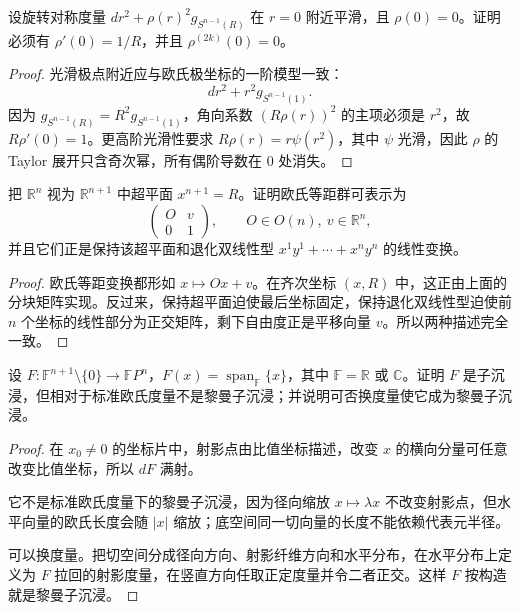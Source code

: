 \documentclass[11pt,a4paper,openany]{ctexbook}
\numberwithin{equation}{chapter}
\begin{document}
\begin{problem}
设旋转对称度量 \(dr^2+\rho(r)^2g_{S^{n-1}(R)}\) 在 \(r=0\) 附近平滑，且 \(\rho(0)=0\)。证明必须有 \(\rho'(0)=1/R\)，并且 \(\rho^{(2k)}(0)=0\)。
\end{problem}
\begin{proof}
光滑极点附近应与欧氏极坐标的一阶模型一致：
\[
dr^2+r^2g_{S^{n-1}(1)}.
\]
因为 \(g_{S^{n-1}(R)}=R^2g_{S^{n-1}(1)}\)，角向系数 \((R\rho(r))^2\) 的主项必须是 \(r^2\)，故 \(R\rho'(0)=1\)。更高阶光滑性要求 \(R\rho(r)=r\psi(r^2)\)，其中 \(\psi\) 光滑，因此 \(\rho\) 的 Taylor 展开只含奇次幂，所有偶阶导数在 \(0\) 处消失。
\end{proof}

\begin{problem}
把 \(\mathbb R^n\) 视为 \(\mathbb R^{n+1}\) 中超平面 \(x^{n+1}=R\)。证明欧氏等距群可表示为
\[
\begin{pmatrix}O&v\\0&1\end{pmatrix},\qquad O\in O(n),\ v\in\mathbb R^n,
\]
并且它们正是保持该超平面和退化双线性型 \(x^1y^1+\cdots+x^ny^n\) 的线性变换。
\end{problem}
\begin{proof}
欧氏等距变换都形如 \(x\mapsto Ox+v\)。在齐次坐标 \((x,R)\) 中，这正由上面的分块矩阵实现。反过来，保持超平面迫使最后坐标固定，保持退化双线性型迫使前 \(n\) 个坐标的线性部分为正交矩阵，剩下自由度正是平移向量 \(v\)。所以两种描述完全一致。
\end{proof}

\begin{problem}
设 \(F\colon \mathbb F^{n+1}\setminus\{0\}\to\mathbb FP^n\)，\(F(x)=\operatorname{span}_{\mathbb F}\{x\}\)，其中 \(\mathbb F=\mathbb R\) 或 \(\mathbb C\)。证明 \(F\) 是子沉浸，但相对于标准欧氏度量不是黎曼子沉浸；并说明可否换度量使它成为黎曼子沉浸。
\end{problem}
\begin{proof}
在 \(x_0\ne0\) 的坐标片中，射影点由比值坐标描述，改变 \(x\) 的横向分量可任意改变比值坐标，所以 \(dF\) 满射。

它不是标准欧氏度量下的黎曼子沉浸，因为径向缩放 \(x\mapsto \lambda x\) 不改变射影点，但水平向量的欧氏长度会随 \(|x|\) 缩放；底空间同一切向量的长度不能依赖代表元半径。

可以换度量。把切空间分成径向方向、射影纤维方向和水平分布，在水平分布上定义为 \(F\) 拉回的射影度量，在竖直方向任取正定度量并令二者正交。这样 \(F\) 按构造就是黎曼子沉浸。
\end{proof}
\end{document}
